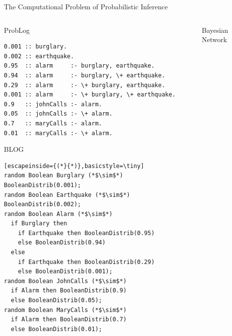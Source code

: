 \documentclass{beamer}
\begin{document}
\begin{frame}[fragile]{The Computational Problem of Probabilistic Inference}
  \vspace{-0.75cm}
  \begin{columns}[t]
    \begin{column}{0.65\textwidth}
      \centering
      \begin{block}{ProbLog}
        \vspace{-0.2cm}
        \begin{lstlisting}[basicstyle=\tiny]
0.001 :: burglary.
0.002 :: earthquake.
0.95  :: alarm     :- burglary, earthquake.
0.94  :: alarm     :- burglary, \+ earthquake.
0.29  :: alarm     :- \+ burglary, earthquake.
0.001 :: alarm     :- \+ burglary, \+ earthquake.
0.9   :: johnCalls :- alarm.
0.05  :: johnCalls :- \+ alarm.
0.7   :: maryCalls :- alarm.
0.01  :: maryCalls :- \+ alarm.
        \end{lstlisting}
        \vspace{-0.2cm}
      \end{block}
      \vspace{-0.25cm}
      \begin{block}{BLOG}
        \vspace{-0.2cm}
        \begin{lstlisting}[escapeinside={(*}{*)},basicstyle=\tiny]
random Boolean Burglary (*$\sim$*) BooleanDistrib(0.001);
random Boolean Earthquake (*$\sim$*) BooleanDistrib(0.002);
random Boolean Alarm (*$\sim$*)
  if Burglary then
    if Earthquake then BooleanDistrib(0.95)
    else BooleanDistrib(0.94)
  else
    if Earthquake then BooleanDistrib(0.29)
    else BooleanDistrib(0.001);
random Boolean JohnCalls (*$\sim$*)
  if Alarm then BooleanDistrib(0.9)
  else BooleanDistrib(0.05);
random Boolean MaryCalls (*$\sim$*)
  if Alarm then BooleanDistrib(0.7)
  else BooleanDistrib(0.01);
        \end{lstlisting}
        \vspace{-0.2cm}
      \end{block}
    \end{column}
    \begin{column}{0.35\textwidth}
      \begin{block}{Bayesian Network}
        \centering
\end{block}
\end{column}
\end{columns}
\end{frame}
\end{document}
